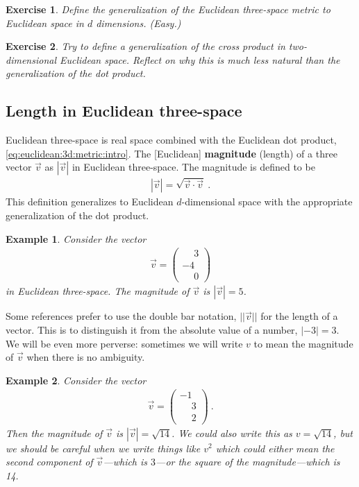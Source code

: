 \documentclass[12pt]{article}
\newtheorem{exercise}{Exercise}[section]
\newtheorem{example}{Example}[section]
\begin{document}
\begin{exercise}
Define the generalization of the Euclidean three-space metric to Euclidean space in $d$ dimensions. (Easy.)
\end{exercise}

\begin{exercise}
Try to define a generalization of the cross product in two-dimensional Euclidean space. Reflect on why this is much less natural than the generalization of the dot product. 
\end{exercise}

\subsection{Length in Euclidean three-space}

Euclidean three-space is real space combined with the Euclidean dot product, \eqref{eq:euclidean:3d:metric:intro}. The [Euclidean] \textbf{magnitude} (length) of a three vector $\vec{v}$ as $|\vec{v}|$ in Euclidean three-space. The magnitude is defined to be
\begin{align}
    |\vec{v}| = \sqrt{\vec{v}\cdot\vec{v}} \ .
\end{align}
This definition generalizes to Euclidean $d$-dimensional space with the appropriate generalization of the dot product.

\begin{example}
Consider the vector
\begin{align}
    \vec{v} = 
    \begin{pmatrix}
    \phantom{+}3\\-4\\\phantom{+}0    
    \end{pmatrix}
\end{align}
in Euclidean three-space. The magnitude of $\vec{v}$ is $|\vec{v}| = 5$.
\end{example}


Some references prefer to use the double bar notation, $||\vec{v}||$ for the length of a vector. This is to distinguish it from the absolute value of a number, $|-3| = 3$. We will be even more perverse: sometimes we will write $v$ to mean the magnitude of $\vec{v}$ when there is no ambiguity.

\begin{example}
Consider the vector
\begin{align}
    \vec{v} = 
    \begin{pmatrix}
    -1\\ \phantom{+}3\\ \phantom{+}2
    \end{pmatrix} \ .
\end{align}
Then the \emph{magnitude} of $\vec{v}$ is $|\vec{v}|=\sqrt{14}$. We could also write this as $v = \sqrt{14}$, but we should be careful when we write things like $v^2$ which could either mean the second component of $\vec{v}$---which is $3$---or the square of the magnitude---which is 14. 
\end{example}
\end{document}
